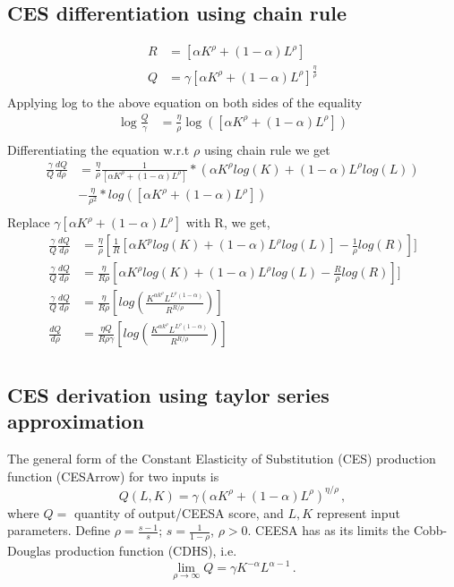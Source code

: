 \documentclass{article}
\begin{document}
\subsection{CES differentiation using chain rule}
\begin{align*}
R &=[\alpha K^\rho +(1-\alpha)L^\rho]\\
Q &= \gamma [\alpha K^\rho +(1-\alpha)L^\rho]^{\frac{\eta}{\rho}}\\
\end{align*}
Applying log to the above equation on both sides of the equality
\begin{align*}
\log {\frac{Q}{\gamma}} &= {\frac{\eta}{\rho}} \log{([\alpha K^\rho +(1-\alpha)L^\rho])}\\
\end{align*}
Differentiating the equation w.r.t $\rho$ using chain rule we get
\begin{align*}
\frac{\gamma}{Q} \frac{dQ}{d\rho} &=\frac{\eta}{\rho} \frac{1}{[\alpha K^\rho +(1-\alpha)L^\rho]} *(\alpha K^\rho log(K) + (1-\alpha) L^\rho log(L) ) \\
 & -\frac{\eta}{\rho^2} * log([\alpha K^\rho +(1-\alpha)L^\rho])\\
\end{align*}
 Replace $\gamma [\alpha K^{\rho} +(1-\alpha)L^{\rho}]$ with R, we get,
 \begin{align*}
 \frac{\gamma}{Q} \frac{dQ}{d\rho} &= \frac{\eta}{\rho}[\frac{1}{R}[\alpha K^p log(K) + (1 -\alpha)L^\rho log(L)] -\frac{1}{\rho}log(R)]]\\
 \frac{\gamma}{Q} \frac{dQ}{d\rho} &= \frac{\eta}{R\rho}[\alpha K^\rho log(K) + (1 -\alpha)L^\rho log(L) -\frac{R}{\rho}log(R)]]\\
  \frac{\gamma}{Q} \frac{dQ}{d\rho} &= \frac{\eta}{R\rho}[log(\frac{K^{\alpha k^\rho}L^{L^\rho (1-\alpha)}}{R^{R/\rho}})]\\ \frac{dQ}{d\rho} &= \frac{\eta Q}{R\rho \gamma}[log(\frac{K^{\alpha k^\rho}L^{L^\rho (1-\alpha)}}{R^{R/\rho}})]\\
\end{align*}

\subsection{CES derivation using taylor series approximation}
The general form of the  Constant Elasticity of Substitution (CES) production function ({CESArrow}) for two inputs is 
\begin{equation*}          
Q(L,K)=\gamma\left(\alpha{K}^\rho+(1-\alpha)L^\rho\right)^{\eta/\rho}\,,
\end{equation*}
where $Q=$ quantity of output/CEESA score, and $L, K $ represent input parameters. Define
\(\rho=\frac{s-1}{s}\); 
 \(s=\frac{1}{1-\rho}\), $\rho >0$. CEESA has as its limits the Cobb-Douglas production function (CDHS), i.e.  
$$
\lim_{\rho\rightarrow\infty} Q = \gamma K^{-\alpha} L^{\alpha-1}\,.
$$ 
\end{document}
